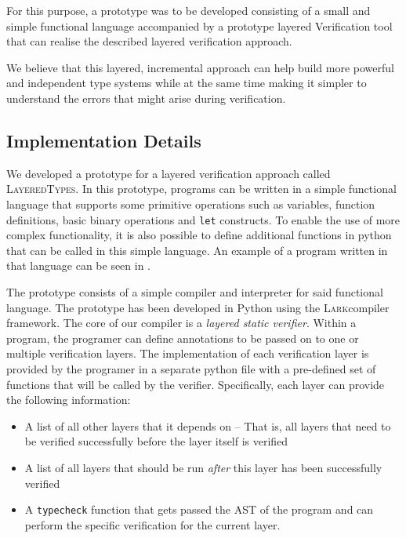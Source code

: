 \documentclass{easychair}
\newcommand{\LayeredTypes}{\textsc{LayeredTypes}}
\newcommand{\Lark}{\textsc{Lark}}
\begin{document}
For this purpose, a prototype was to be developed consisting of a small and simple functional language accompanied by a prototype layered Verification tool that can realise the described layered verification approach.

We believe that this layered, incremental approach can help build more powerful and independent type systems while at the same time making it simpler to understand the errors that might arise during verification.

\subsection{Implementation Details}

We developed a prototype for a layered verification approach called \LayeredTypes. In this prototype, programs can be written in a simple functional language that supports some primitive operations such as variables, function definitions, basic binary operations and \texttt{let} constructs. To enable the use of more complex functionality, it is also possible to define additional functions in python that can be called in this simple language. An example of a program written in that language can be seen in .

The prototype consists of a simple compiler and interpreter for said functional language. The prototype has been developed in Python using the \Lark compiler framework. The core of our compiler is a \textit{layered static verifier}. Within a program, the programer can define annotations to be passed on to one or multiple verification layers. The implementation of each verification layer is provided by the programer in a separate python file with a pre-defined set of functions that will be called by the verifier. Specifically, each layer can provide the following information:

\begin{itemize}
	\item A list of all other layers that it depends on -- That is, all layers that need to be verified successfully before the layer itself is verified
	\item A list of all layers that should be run \textit{after} this layer has been successfully verified
	\item A \texttt{typecheck} function that gets passed the AST of the program and can perform the specific verification for the current layer.
\end{itemize}
\end{document}
